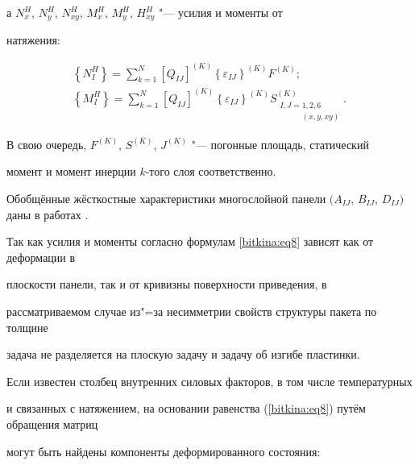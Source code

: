а $N_x^H$, $N_y^H$, $N_{xy}^H$, $M_x^H$, $M_y^H$, $H_{xy}^H$ "--- усилия и моменты от

натяжения:

\begin{equation}

\label{bitkina:eq10}

\begin{array}{c}

\left\{N_I^H  \right\}=\sum\limits_{k=1}^N \left[ Q_{I\!J} \right]^{( K)} \left\{\varepsilon _{I\!J}  \right\}^{( K )}F^{( K )}; \\

\left\{M_I^H  \right\}=\sum\limits_{k=1}^N \left[ Q_{I\!J} \right]^{( K )} \left\{ \varepsilon _{I\!J} \right\}^{( K)}S^{( K )}_{\substack{I, J=1, 2, 6 \\

\phantom{I, J=}(x, y, xy)}}.

\end{array}

\end{equation}

В свою очередь, $F^{(K)}$, $ S^{(K)}$, $J^{(K)}$ "--- погонные площадь, статический

момент и момент инерции $k$-того слоя соответственно.



Обобщённые жёсткостные характеристики многослойной панели $(A_{I\!J}$, $B_{I\!J}$, $D_{I\!J})$ даны в работах \cite{bitkina:bib4,bitkina:bib6,bitkina:bib8}.



Так как усилия и моменты согласно формулам \eqref{bitkina:eq8} зависят как от деформации в

плоскости панели, так и от кривизны поверхности приведения, в

рассматриваемом случае из"=за несимметрии свойств структуры пакета по толщине

задача не разделяется на плоскую задачу и задачу об изгибе пластинки.



Если известен столбец внутренних силовых факторов, в том числе температурных

и связанных с натяжением, на основании равенства (\ref{bitkina:eq8}) путём обращения матриц

могут быть найдены компоненты деформированного состояния:


